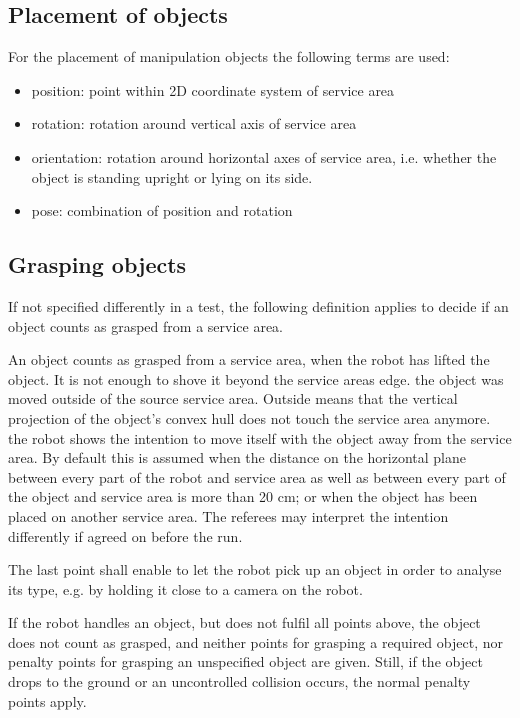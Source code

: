\subsection{Placement of objects}
For the placement of manipulation objects the following terms are used:

\begin{itemize}
\item position: point within 2D coordinate system of service area
\item rotation: rotation around vertical axis of service area
\item orientation: rotation around horizontal axes of service area, i.e. whether the object is standing upright or lying on its side.
\item pose: combination of position and rotation
\end{itemize}

\subsection{Grasping objects}
If not specified differently in a test, the following definition applies to decide if an object counts as grasped from a service area.
\par
An object counts as grasped from a service area, when
the robot has lifted the object. It is not enough to shove it beyond the service areas edge.
the object was moved outside of the source service area. Outside means that the vertical projection of the object’s convex hull does not touch the service area anymore.
the robot shows the intention to move itself with the object away from the service area. By default this is assumed when the distance on the horizontal plane between every part of the robot and service area as well as between every part of the object and service area is more than 20 cm; or when the object has been placed on another service area. The referees may interpret the intention differently if agreed on before the run.
\par
The last point shall enable to let the robot pick up an object in order to analyse its type, e.g. by holding it close to a camera on the robot.
\par
If the robot handles an object, but does not fulfil all points above, the object does not count as grasped, and neither points for grasping a required object, nor penalty points for grasping an unspecified object are given. Still, if the object drops to the ground or an uncontrolled collision occurs, the normal penalty points apply.

